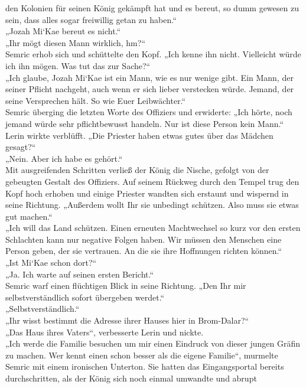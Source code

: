 den Kolonien für seinen König gekämpft hat und es bereut, so dumm gewesen zu sein, dass alles sogar 
freiwillig getan zu haben.“\\
„Jozah Mi‘Kae bereut es nicht.“\\
„Ihr mögt diesen Mann wirklich, hm?“\\
Semric erhob sich und schüttelte den Kopf. „Ich kenne ihn nicht. Vielleicht würde ich ihn mögen. Was 
tut das zur Sache?“\\
„Ich glaube, Jozah Mi‘Kae ist ein Mann, wie es nur wenige gibt. Ein Mann, der seiner Pflicht 
nachgeht, auch wenn er sich lieber verstecken würde. Jemand, der seine Versprechen hält. So wie Euer 
Leibwächter.“\\
Semric überging die letzten Worte des Offiziers und erwiderte: „Ich hörte, noch jemand würde sehr 
pflichtbewusst handeln. Nur ist diese Person kein Mann.“\\
Lerin wirkte verblüfft. „Die Priester haben etwas gutes über das Mädchen gesagt?“\\
„Nein. Aber ich habe es gehört.“\\
Mit ausgreifenden Schritten verließ der König die Nische, gefolgt von der gebeugten Gestalt des 
Offiziers. Auf seinem Rückweg durch den Tempel trug den Kopf hoch erhoben und einige Priester 
wandten sich erstaunt und wispernd in seine Richtung. „Außerdem wollt Ihr sie unbedingt schützen. 
Also muss sie etwas gut machen.“\\
„Ich will das Land schützen. Einen erneuten Machtwechsel so kurz vor den ersten Schlachten kann nur 
negative Folgen haben. Wir müssen den Menschen eine Person geben, der sie vertrauen. An die sie ihre 
Hoffnungen richten können.“\\
„Ist Mi‘Kae schon dort?“\\
„Ja. Ich warte auf seinen ersten Bericht.“\\
Semric warf einen flüchtigen Blick in seine Richtung. „Den Ihr mir selbstverständlich sofort 
übergeben werdet.“\\
„Selbstverständlich.“\\
„Ihr wisst bestimmt die Adresse ihrer Hauses hier in Brom-Dalar?“\\
„Das Haus ihres Vaters“, verbesserte Lerin und nickte.\\
„Ich werde die Familie besuchen um mir einen Eindruck von dieser jungen Gräfin zu machen. Wer kennt 
einen schon besser als die eigene Familie“, murmelte Semric mit einem ironischen Unterton. Sie 
hatten das Eingangsportal bereits durchschritten, als der König sich noch einmal umwandte und abrupt 
